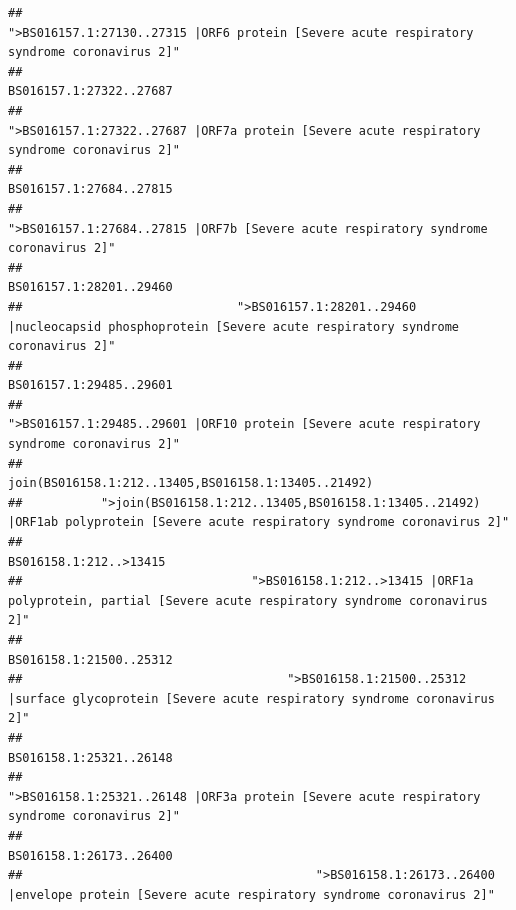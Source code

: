 \documentclass[
]{article}
\begin{document}
\begin{verbatim}
##                                             ">BS016157.1:27130..27315 |ORF6 protein [Severe acute respiratory syndrome coronavirus 2]" 
##                                                                                                                BS016157.1:27322..27687 
##                                            ">BS016157.1:27322..27687 |ORF7a protein [Severe acute respiratory syndrome coronavirus 2]" 
##                                                                                                                BS016157.1:27684..27815 
##                                                    ">BS016157.1:27684..27815 |ORF7b [Severe acute respiratory syndrome coronavirus 2]" 
##                                                                                                                BS016157.1:28201..29460 
##                              ">BS016157.1:28201..29460 |nucleocapsid phosphoprotein [Severe acute respiratory syndrome coronavirus 2]" 
##                                                                                                                BS016157.1:29485..29601 
##                                            ">BS016157.1:29485..29601 |ORF10 protein [Severe acute respiratory syndrome coronavirus 2]" 
##                                                                                    join(BS016158.1:212..13405,BS016158.1:13405..21492) 
##           ">join(BS016158.1:212..13405,BS016158.1:13405..21492) |ORF1ab polyprotein [Severe acute respiratory syndrome coronavirus 2]" 
##                                                                                                                 BS016158.1:212..>13415 
##                                ">BS016158.1:212..>13415 |ORF1a polyprotein, partial [Severe acute respiratory syndrome coronavirus 2]" 
##                                                                                                                BS016158.1:21500..25312 
##                                     ">BS016158.1:21500..25312 |surface glycoprotein [Severe acute respiratory syndrome coronavirus 2]" 
##                                                                                                                BS016158.1:25321..26148 
##                                            ">BS016158.1:25321..26148 |ORF3a protein [Severe acute respiratory syndrome coronavirus 2]" 
##                                                                                                                BS016158.1:26173..26400 
##                                         ">BS016158.1:26173..26400 |envelope protein [Severe acute respiratory syndrome coronavirus 2]" 

\end{verbatim}
\end{document}
